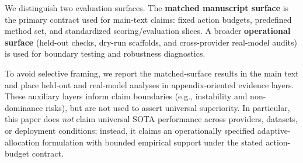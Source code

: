 We distinguish two evaluation surfaces. The \textbf{matched manuscript surface} is the primary contract used for main-text claims: fixed action budgets, predefined method set, and standardized scoring/evaluation slices. A broader \textbf{operational surface} (held-out checks, dry-run scaffolds, and cross-provider real-model audits) is used for boundary testing and robustness diagnostics.

To avoid selective framing, we report the matched-surface results in the main text and place held-out and real-model analyses in appendix-oriented evidence layers. These auxiliary layers inform claim boundaries (e.g., instability and non-dominance risks), but are not used to assert universal superiority. In particular, this paper does \emph{not} claim universal SOTA performance across providers, datasets, or deployment conditions; instead, it claims an operationally specified adaptive-allocation formulation with bounded empirical support under the stated action-budget contract.
